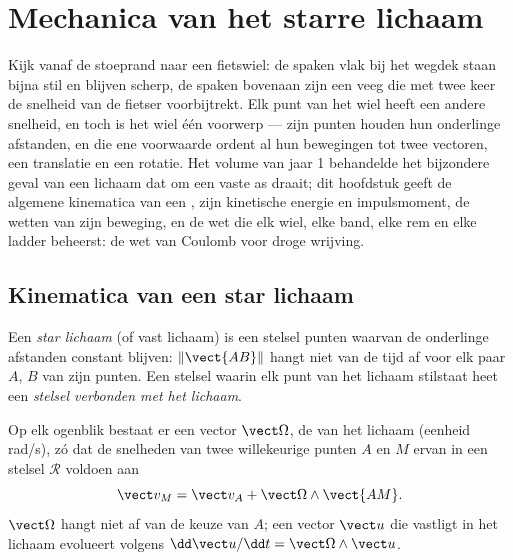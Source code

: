 \chapter{Mechanica van het starre lichaam}\label{ch:b2:rigid-body-mechanics}

Kijk vanaf de stoeprand naar een fietswiel: de spaken vlak bij het wegdek
staan bijna stil en blijven scherp, de spaken bovenaan zijn een veeg die
met twee keer de snelheid van de fietser voorbijtrekt. Elk punt van het
wiel heeft een andere snelheid, en toch is het wiel één voorwerp --- zijn
punten houden hun onderlinge afstanden, en die ene voorwaarde ordent al
hun bewegingen tot twee vectoren, een translatie en een rotatie. Het
volume van jaar 1 behandelde het bijzondere geval van een lichaam dat om
een vaste as draait; dit hoofdstuk geeft de algemene kinematica van een
, zijn kinetische energie en impulsmoment, de wetten van zijn
beweging, en de wet die elk wiel, elke band, elke rem en elke ladder
beheerst: de wet van Coulomb voor droge wrijving.

\section{Kinematica van een star lichaam}

\begin{definition}\label{def:b2:rigid-body-mechanics:solid}
Een \emph{star lichaam} (of vast lichaam) is een stelsel punten waarvan
de onderlinge afstanden constant blijven: $\|\vect{AB}\|$ hangt niet van
de tijd af voor elk paar $A$, $B$ van zijn punten. Een stelsel waarin elk
punt van het lichaam stilstaat heet een \emph{stelsel verbonden met het
lichaam}.
\end{definition}

\begin{theorem}\label{thm:b2:rigid-body-mechanics:field}
Op elk ogenblik bestaat er een vector $\vect\Omega$, de \emph{}
van het lichaam (eenheid \unit{rad/s}), zó dat de snelheden van twee
willekeurige punten $A$ en $M$ ervan in een stelsel $\mathcal R$ voldoen aan
\[
\vect v_M = \vect v_A + \vect\Omega\wedge\vect{AM} .
\]
$\vect\Omega$ hangt niet af van de keuze van $A$; een vector $\vect u$ die
vastligt in het lichaam evolueert volgens
$\dd\vect u/\dd t = \vect\Omega\wedge\vect u$.
\end{theorem}

